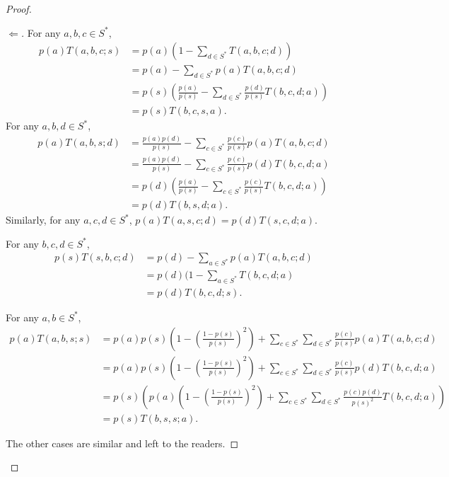 \documentclass[AHL,Unicode,longabstracts]{cedram}
\newcounter{a}
\begin{document}
\begin{proof}
\begin{proof}[$\Leftarrow$]
For any $a,b,c \in S^*$,
\begin{align*}
p(a) T(a,b,c;s) & = p(a) \left(1 - \sum_{d \in S^*} T(a,b,c;d) \right)\\
& = p(a) - \sum_{d\in S^*} p(a) T(a,b,c;d) \\
& = p(s) \left(\frac{p(a)}{p(s)} - \sum_{d \in S^*} \frac{p(d)}{p(s)} T(b,c,d;a) \right) \\
& = p(s) T(b,c,s,a).
\end{align*}
For any $a,b,d \in S^*$,
\begin{align*}
p(a) T(a,b,s;d) & = \frac{p(a)p(d)}{p(s)} - \sum_{c \in S^*} \frac{p(c)}{p(s)} p(a) T(a,b,c;d) \\
& = \frac{p(a)p(d)}{p(s)} - \sum_{c \in S^*} \frac{p(c)}{p(s)} p(d) T(b,c,d;a) \\
& = p(d) \left(\frac{p(a)}{p(s)} - \sum_{c \in S^*} \frac{p(c)}{p(s)} T(b,c,d;a) \right) \\
& = p(d) T(b,s,d;a).
\end{align*}
Similarly, for any $a,c,d \in S^*$, $p(a) T(a,s,c;d) = p(d) T(s,c,d;a)$.

For any $b,c,d \in S^*$,
\begin{align*}
p(s) T(s,b,c;d) & = p(d) - \sum_{a\in S^*} p(a) T(a,b,c;d)\\
& = p(d) (1 - \sum_{a \in S^*} T(b,c,d;a) \\
& = p(d) T(b,c,d;s).
\end{align*}

For any $a,b \in S^*$,
\begin{align*}
p(a) T(a,b,s;s) & = p(a) p(s) \left(1 - \left(\frac{1-p(s)}{p(s)}\right)^2 \right) + \sum_{c \in S^*} \sum_{d \in S^*} \frac{p(c)}{p(s)} p(a) T(a,b,c;d)\\
& = p(a) p(s) \left(1 - \left(\frac{1-p(s)}{p(s)}\right)^2 \right) + \sum_{c \in S^*} \sum_{d \in S^*} \frac{p(c)}{p(s)} p(d) T(b,c,d;a)\\
& = p(s) \left(p(a) \left(1 - \left(\frac{1-p(s)}{p(s)}\right)^2 \right) + \sum_{c \in S^*} \sum_{d \in S^*} \frac{p(c)p(d)}{p(s)^2} T(b,c,d;a) \right)\\
& = p(s) T(b,s,s;a).
\end{align*}

The other cases are similar and left to the readers.
\end{proof}
\let\qed\relax
\end{proof}
\end{document}
